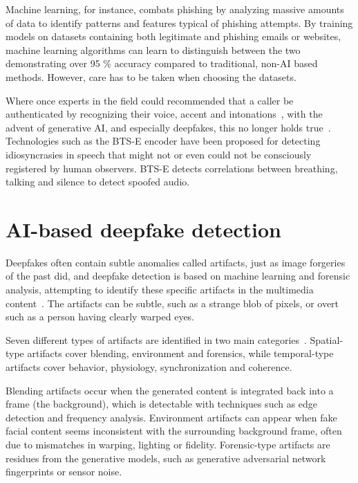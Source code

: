 Machine learning, for instance, combats phishing by analyzing massive amounts of data to identify patterns and features typical of phishing attempts. By training models on datasets containing both legitimate and phishing emails or websites, machine learning algorithms can learn to distinguish between the two demonstrating over 95 \% accuracy compared to traditional, non-AI based methods. However, care has to be taken when choosing the datasets.


Where once experts in the field could recommended that a caller be authenticated by recognizing their voice, accent and intonations~\citep{mitnick_The_Art_of_Deception_2003}, with the advent of generative AI, and especially deepfakes, this no longer holds true~\citep{doan_BTSE_Audio_Deepfake_Detection_2023}. Technologies such as the BTS-E encoder have been proposed for detecting idiosyncrasies in speech that might not or even could not be consciously registered by human observers. BTS-E detects correlations between breathing, talking and silence to detect spoofed audio.

\section{AI-based deepfake detection}
\begin{comment}
  -
\end{comment}

Deepfakes often contain subtle anomalies called artifacts, just as image forgeries of the past did, and deepfake detection is based on machine learning and forensic analysis, attempting to identify these specific artifacts in the multimedia content~\citep{mirsky_Creation_Detection_Deepfakes_2021}. The artifacts can be subtle, such as a strange blob of pixels, or overt such as a person having clearly warped eyes.

Seven different types of artifacts are identified in two main categories~\citep{mirsky_Creation_Detection_Deepfakes_2021}. Spatial-type artifacts cover blending, environment and forensics, while temporal-type artifacts cover behavior, physiology, synchronization and coherence.

Blending artifacts occur when the generated content is integrated back into a frame (the background), which is detectable with techniques such as edge detection and frequency analysis. Environment artifacts can appear when fake facial content seems inconsistent with the surrounding background frame, often due to mismatches in warping, lighting or fidelity. Forensic-type artifacts are residues from the generative models, such as generative adversarial network fingerprints or sensor noise.

